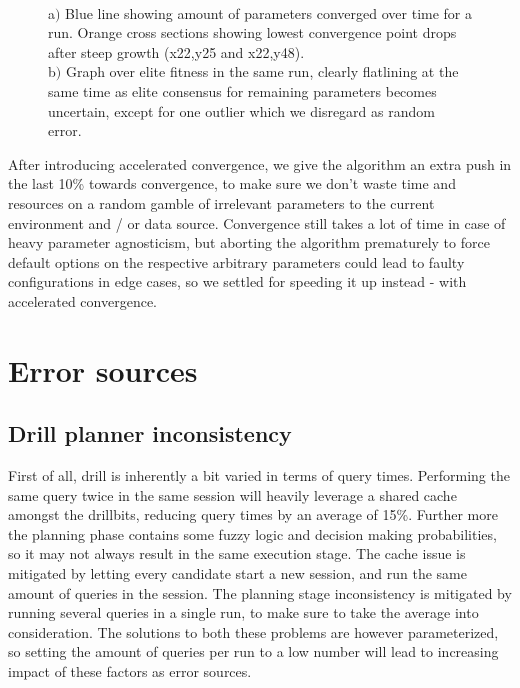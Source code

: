 \documentclass[a4paper,english]{report}
\begin{document}
		\begin{figure}[H]
			\centering
			\qquad
			\caption{\\a$)$ Blue line showing amount of parameters converged over time for a run. Orange cross sections showing lowest convergence point drops after steep growth (x22,y25 and x22,y48).\\b$)$ Graph over elite fitness in the same run, clearly flatlining at the same time as elite consensus for remaining parameters becomes uncertain, except for one outlier which we disregard as random error.}
			\label{fig:agnos2}
		\end{figure}
		After introducing accelerated convergence, we give the algorithm an extra push in the last 10\% towards convergence, to make sure we don't waste time and resources on a random gamble of irrelevant parameters to the current environment and / or data source. Convergence still takes a lot of time in case of heavy parameter agnosticism, but aborting the algorithm prematurely to force default options on the respective arbitrary parameters could lead to faulty configurations in edge cases, so we settled for speeding it up instead - with accelerated convergence.
		\clearpage
	\section{Error sources}
		\subsection{Drill planner inconsistency}
		First of all, drill is inherently a bit varied in terms of query times. Performing the same query twice in the same session will heavily leverage a shared cache amongst the drillbits, reducing query times by an average of 15\%. Further more the planning phase contains some fuzzy logic and decision making probabilities, so it may not always result in the same execution stage. The cache issue is mitigated by letting every candidate start a new session, and run the same amount of queries in the session. The planning stage inconsistency is mitigated by running several queries in a single run, to make sure to take the average into consideration. The solutions to both these problems are however parameterized, so setting the amount of queries per run to a low number will lead to increasing impact of these factors as error sources.
\end{document}
